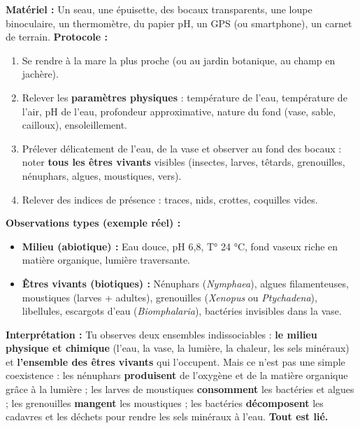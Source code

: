 \documentclass[11pt]{article}
\begin{document}
\begin{experience}
\textbf{Matériel :} Un seau, une épuisette, des bocaux transparents, une loupe binoculaire, un thermomètre, du papier pH, un GPS (ou smartphone), un carnet de terrain.
\textbf{Protocole :}
\begin{enumerate}
    \item Se rendre à la mare la plus proche (ou au jardin botanique, au champ en jachère).
    \item Relever les \textbf{paramètres physiques} : température de l'eau, température de l'air, pH de l'eau, profondeur approximative, nature du fond (vase, sable, cailloux), ensoleillement.
    \item Prélever délicatement de l'eau, de la vase et observer au fond des bocaux : noter \textbf{tous les êtres vivants} visibles (insectes, larves, têtards, grenouilles, nénuphars, algues, moustiques, vers).
    \item Relever des indices de présence : traces, nids, crottes, coquilles vides.
\end{enumerate}
\textbf{Observations types (exemple réel) :}
\begin{itemize}
    \item \textbf{Milieu (abiotique) :} Eau douce, pH 6,8, T° 24 °C, fond vaseux riche en matière organique, lumière traversante.
    \item \textbf{Êtres vivants (biotiques) :} Nénuphars (\emph{Nymphaea}), algues filamenteuses, moustiques (larves + adultes), grenouilles (\emph{Xenopus} ou \emph{Ptychadena}), libellules, escargots d'eau (\emph{Biomphalaria}), bactéries invisibles dans la vase.
\end{itemize}
\textbf{Interprétation :} Tu observes deux ensembles indissociables : \textbf{le milieu physique et chimique} (l'eau, la vase, la lumière, la chaleur, les sels minéraux) et \textbf{l'ensemble des êtres vivants} qui l'occupent. Mais ce n'est pas une simple coexistence : les nénuphars \textbf{produisent} de l'oxygène et de la matière organique grâce à la lumière ; les larves de moustiques \textbf{consomment} les bactéries et algues ; les grenouilles \textbf{mangent} les moustiques ; les bactéries \textbf{décomposent} les cadavres et les déchets pour rendre les sels minéraux à l'eau. \textbf{Tout est lié.}
\end{experience}
\end{document}
